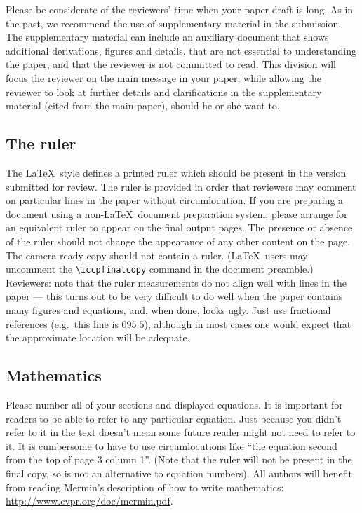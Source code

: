 \documentclass[10pt,twocolumn,letterpaper]{article}
\begin{document}
Please be considerate of the reviewers' time when your paper draft is long. As in the past, we recommend the use of supplementary material in the submission. The supplementary material can include an auxiliary document that shows additional derivations, figures and details, that are not essential to understanding the paper, and that the reviewer is not committed to read. This division will focus the reviewer on the main message in your paper, while allowing the reviewer to look at further details and  clarifications in the supplementary material (cited from the main paper), should he or she want to.

\subsection{The ruler}
The \LaTeX\ style defines a printed ruler which should be present in the
version submitted for review.  The ruler is provided in order that
reviewers may comment on particular lines in the paper without
circumlocution.  If you are preparing a document using a non-\LaTeX\
document preparation system, please arrange for an equivalent ruler to
appear on the final output pages.  The presence or absence of the ruler
should not change the appearance of any other content on the page.  The
camera ready copy should not contain a ruler. (\LaTeX\ users may uncomment
the \verb'\iccpfinalcopy' command in the document preamble.)  Reviewers:
note that the ruler measurements do not align well with lines in the paper
--- this turns out to be very difficult to do well when the paper contains
many figures and equations, and, when done, looks ugly.  Just use fractional
references (e.g.\ this line is $095.5$), although in most cases one would
expect that the approximate location will be adequate.

\subsection{Mathematics}

Please number all of your sections and displayed equations.  It is
important for readers to be able to refer to any particular equation.  Just
because you didn't refer to it in the text doesn't mean some future reader
might not need to refer to it.  It is cumbersome to have to use
circumlocutions like ``the equation second from the top of page 3 column
1''.  (Note that the ruler will not be present in the final copy, so is not
an alternative to equation numbers).  All authors will benefit from reading
Mermin's description of how to write mathematics: \url{http://www.cvpr.org/doc/mermin.pdf}.
\end{document}
